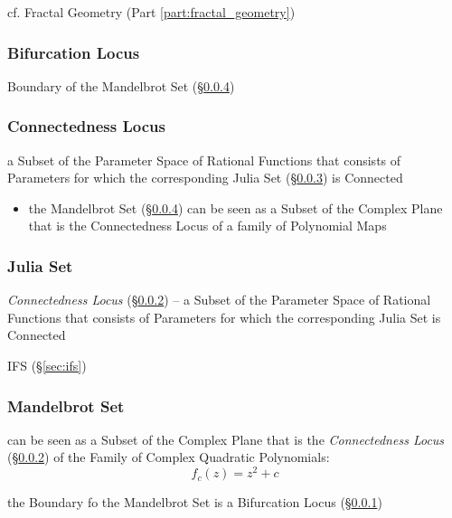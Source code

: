 cf. Fractal Geometry (Part \ref{part:fractal_geometry})



\subsubsection{Bifurcation Locus}\label{sec:bifurcation_locus}

Boundary of the Mandelbrot Set (\S\ref{sec:mandelbrot_set})



\subsubsection{Connectedness Locus}\label{sec:connectedness_locus}

a Subset of the Parameter Space of Rational Functions that consists of
Parameters for which the corresponding Julia Set (\S\ref{sec:julia_set}) is
Connected

\begin{itemize}
  \item the Mandelbrot Set (\S\ref{sec:mandelbrot_set}) can be seen as a Subset
    of the Complex Plane that is the Connectedness Locus of a family of
    Polynomial Maps
\end{itemize}



\subsubsection{Julia Set}\label{sec:julia_set}

\emph{Connectedness Locus} (\S\ref{sec:connectedness_locus}) -- a Subset of the
Parameter Space of Rational Functions that consists of Parameters for which the
corresponding Julia Set is Connected

IFS (\S\ref{sec:ifs})



\subsubsection{Mandelbrot Set}\label{sec:mandelbrot_set}

can be seen as a Subset of the Complex Plane that is the \emph{Connectedness
  Locus} (\S\ref{sec:connectedness_locus}) of the Family of Complex Quadratic
Polynomials:
\[
  f_c(z) = z^2 + c
\]

the Boundary fo the Mandelbrot Set is a Bifurcation Locus
(\S\ref{sec:bifurcation_locus})



